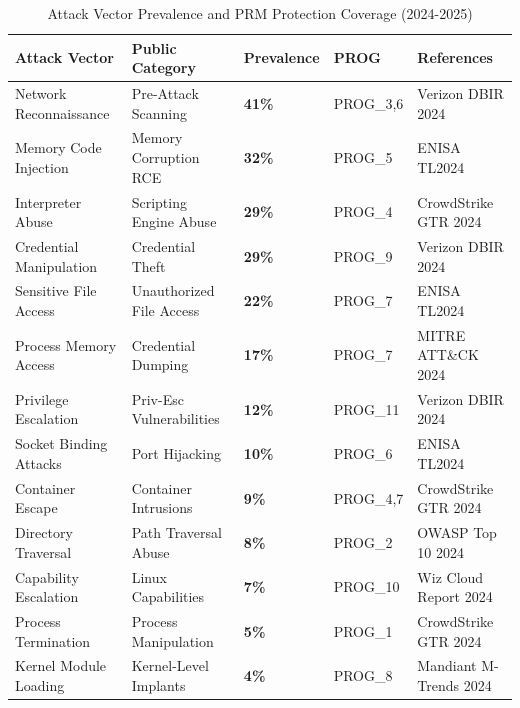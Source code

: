 \documentclass[conference]{IEEEtran}
\begin{document}
\begin{table}[htbp]
\centering
\caption{Attack Vector Prevalence and PRM Protection Coverage (2024-2025)}
\label{tab:attack_coverage}
\begin{tabular}{lllll}
\toprule
\textbf{Attack Vector} & \textbf{Public Category} & \textbf{Prevalence} & \textbf{PROG} & \textbf{References} \\
\midrule
Network Reconnaissance & Pre-Attack Scanning & \textbf{41\%} & PROG\_3,6 & Verizon DBIR 2024 \cite{verizon2024dbir} \\
Memory Code Injection & Memory Corruption RCE & \textbf{32\%} & PROG\_5 & ENISA TL2024 \cite{enisa2024threat} \\
Interpreter Abuse & Scripting Engine Abuse & \textbf{29\%} & PROG\_4 & CrowdStrike GTR 2024 \cite{crowdstrike2024gtr} \\
Credential Manipulation & Credential Theft & \textbf{29\%} & PROG\_9 & Verizon DBIR 2024 \cite{verizon2024dbir} \\
Sensitive File Access & Unauthorized File Access & \textbf{22\%} & PROG\_7 & ENISA TL2024 \cite{enisa2024threat} \\
Process Memory Access & Credential Dumping & \textbf{17\%} & PROG\_7 & MITRE ATT\&CK 2024 \cite{mitre2024attack} \\
Privilege Escalation & Priv-Esc Vulnerabilities & \textbf{12\%} & PROG\_11 & Verizon DBIR 2024 \cite{verizon2024dbir} \\
Socket Binding Attacks & Port Hijacking & \textbf{10\%} & PROG\_6 & ENISA TL2024 \cite{enisa2024threat} \\
Container Escape & Container Intrusions & \textbf{9\%} & PROG\_4,7 & CrowdStrike GTR 2024 \cite{crowdstrike2024gtr} \\
Directory Traversal & Path Traversal Abuse & \textbf{8\%} & PROG\_2 & OWASP Top 10 2024 \cite{owasp2024top10} \\
Capability Escalation & Linux Capabilities & \textbf{7\%} & PROG\_10 & Wiz Cloud Report 2024 \cite{wiz2024cloud} \\
Process Termination & Process Manipulation & \textbf{5\%} & PROG\_1 & CrowdStrike GTR 2024 \cite{crowdstrike2024gtr} \\
Kernel Module Loading & Kernel-Level Implants & \textbf{4\%} & PROG\_8 & Mandiant M-Trends 2024 \cite{mandiant2024mtrends} \\
\bottomrule
\end{tabular}
\end{table}
\end{document}
